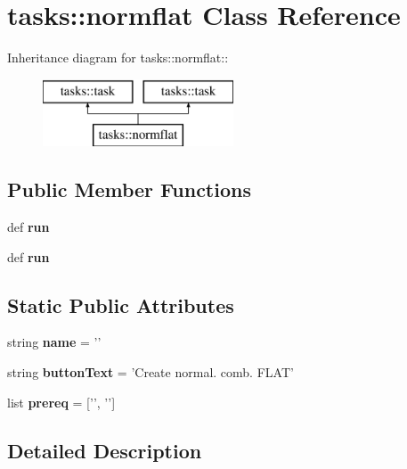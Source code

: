 \section{tasks::normflat Class Reference}
\label{classtasks_1_1normflat}
Inheritance diagram for tasks::normflat::\begin{figure}[H]
\begin{center}
\leavevmode
\includegraphics[height=2cm]{classtasks_1_1normflat}
\end{center}
\end{figure}
\subsection*{Public Member Functions}
\begin{CompactItemize}
\item 
def \textbf{run}\label{classtasks_1_1normflat_0455ac038859f5ae397c0ba9446b9568}

\item 
def \textbf{run}\label{classtasks_1_1normflat_0455ac038859f5ae397c0ba9446b9568}

\end{CompactItemize}
\subsection*{Static Public Attributes}
\begin{CompactItemize}
\item 
string \textbf{name} = '{\bfnormflat}'\label{classtasks_1_1normflat_cfd6c40c5390df753b56a52707f451b1}

\item 
string \textbf{button\-Text} = 'Create normal. comb. FLAT'\label{classtasks_1_1normflat_5720cd427cb5d721d24b81319f2cb9ea}

\item 
list \textbf{prereq} = ['{\bfsumflat}', '{\bffindord}']\label{classtasks_1_1normflat_57693ae545e00aab51aca37dd24b27f6}

\end{CompactItemize}


\subsection{Detailed Description}


